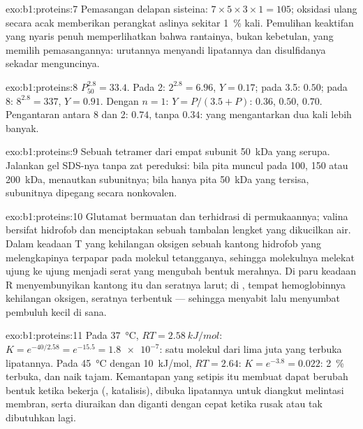 \begin{solution}{exo:b1:proteins:7}
Pemasangan delapan sisteina: $7\times 5\times 3\times 1 = 105$;
oksidasi ulang secara acak memberikan perangkat aslinya sekitar
\qty{1}{\%} kali. Pemulihan keaktifan yang nyaris penuh memperlihatkan
bahwa rantainya, bukan kebetulan, yang memilih pemasangannya: urutannya
menyandi lipatannya dan disulfidanya sekadar menguncinya.
\end{solution}

\begin{solution}{exo:b1:proteins:8}
$P_{50}^{2.8} = 33.4$. Pada 2: $2^{2.8} = 6.96$, $Y = 0.17$; pada 3.5:
$0.50$; pada 8: $8^{2.8} = 337$, $Y = 0.91$. Dengan $n = 1$: $Y =
P/(3.5 + P)$: $0.36$, $0.50$, $0.70$. Pengantaran antara 8 dan 2:
 $0.74$, tanpa  $0.34$:  yang 
mengantarkan dua kali lebih banyak.
\end{solution}

\begin{solution}{exo:b1:proteins:9}
Sebuah tetramer dari empat subunit \qty{50}{kDa} yang serupa.
Jalankan gel SDS-nya tanpa zat pereduksi: bila pita muncul pada 100,
150 atau \qty{200}{kDa},  menautkan subunitnya; bila
hanya pita \qty{50}{kDa} yang tersisa, subunitnya dipegang secara
nonkovalen.
\end{solution}

\begin{solution}{exo:b1:proteins:10}
Glutamat bermuatan dan terhidrasi di permukaannya; valina bersifat
hidrofob dan menciptakan sebuah tambalan lengket yang dikucilkan air.
Dalam keadaan T yang kehilangan oksigen sebuah kantong hidrofob yang
melengkapinya terpapar pada molekul tetangganya, sehingga molekulnya
melekat ujung ke ujung menjadi serat yang mengubah bentuk  merahnya.
Di paru keadaan R menyembunyikan kantong itu dan seratnya larut; di
, tempat hemoglobinnya kehilangan oksigen, seratnya terbentuk
--- sehingga  menyabit lalu menyumbat pembuluh kecil di sana.
\end{solution}

\begin{solution}{exo:b1:proteins:11}
Pada \qty{37}{\celsius}, $RT = \qty{2.58}{kJ/mol}$: $K = e^{-40/2.58} =
e^{-15.5} = \num{1.8e-7}$: satu molekul dari lima juta yang terbuka
lipatannya. Pada \qty{45}{\celsius} dengan \qty{10}{kJ/mol},
$RT = 2.64$: $K = e^{-3.8} =
0.022$: \qty{2}{\%} terbuka, dan naik tajam. Kemantapan yang setipis
itu membuat  dapat berubah bentuk ketika bekerja (,
katalisis), dibuka lipatannya untuk diangkut melintasi membran, serta
diuraikan dan diganti dengan cepat ketika rusak atau tak dibutuhkan lagi.
\end{solution}

